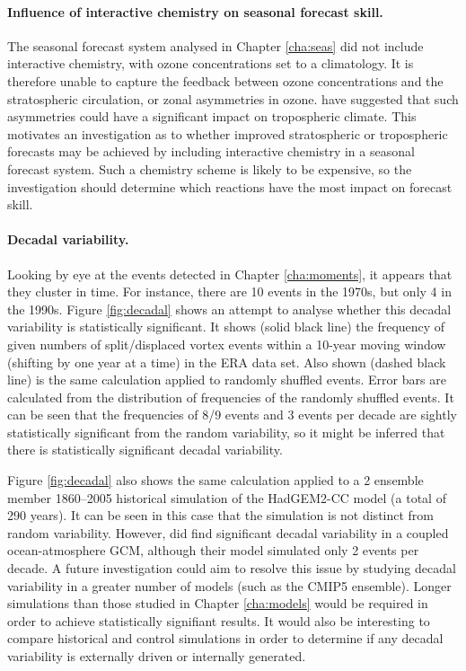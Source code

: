 \paragraph{Influence of interactive chemistry on seasonal forecast skill.} The
seasonal forecast system analysed in Chapter \ref{cha:seas} did not include
interactive chemistry, with ozone concentrations set to a climatology. It is
therefore unable to capture the feedback between ozone concentrations and the
stratospheric circulation, or zonal asymmetries in ozone. \citet{Waugh2009} have
suggested that such asymmetries could have a significant impact on tropospheric
climate. This motivates an investigation as to whether improved stratospheric or
tropospheric forecasts may be achieved by including interactive chemistry in a
seasonal forecast system. Such a chemistry scheme is likely to be expensive, so
the investigation should determine which reactions have the most impact on
forecast skill.


\paragraph{Decadal variability.} Looking by eye at the events detected in
Chapter \ref{cha:moments}, it appears that they cluster in time. For instance,
there are 10 events in the 1970s, but only 4 in the 1990s. Figure
\ref{fig:decadal} shows an attempt to analyse whether this decadal variability
is statistically significant. It shows (solid black line) the frequency of given
numbers of split/displaced vortex events within a 10-year moving window
(shifting by one year at a time) in the ERA data set. Also shown (dashed black
line) is the same calculation applied to randomly shuffled events. Error bars
are calculated from the distribution of frequencies of the randomly shuffled
events. It can be seen that the frequencies of 8/9 events and 3 events per
decade are sightly statistically significant from the random variability, so it
might be inferred that there is statistically significant decadal variability.

Figure \ref{fig:decadal} also shows the same calculation applied to a 2 ensemble
member 1860--2005 historical simulation of the HadGEM2-CC model (a total of 290
years). It can be seen in this case that the simulation is not distinct from
random variability. However, \citet{Schimanke2011} did find significant decadal
variability in a coupled ocean-atmosphere GCM, although their model simulated
only 2 events per decade. A future investigation could aim to resolve this issue
by studying decadal variability in a greater number of models (such as the CMIP5
ensemble). Longer simulations than those studied in Chapter \ref{cha:models}
would be required in order to achieve statistically signifiant results. It would
also be interesting to compare historical and control simulations in order to
determine if any decadal variability is externally driven or internally
generated.


